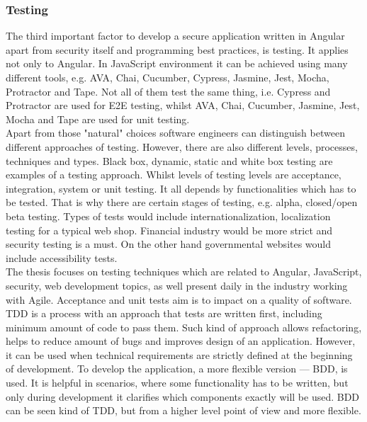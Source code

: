 \documentclass{article} %
\begin{document}
\subsubsection{Testing}
The third important factor to develop a secure application written in Angular apart from security itself and programming best practices, is testing. It applies not only to Angular. In JavaScript environment it can be achieved using many different tools, e.g. AVA, Chai, Cucumber, Cypress, Jasmine, Jest, Mocha, Protractor and Tape. Not all of them test the same thing, i.e. Cypress and Protractor are used for E2E testing, whilst AVA, Chai, Cucumber, Jasmine, Jest, Mocha and Tape are used for unit testing.\\
\newline
Apart from those "natural" choices software engineers can distinguish between different approaches of testing. However, there are also different levels, processes, techniques and types. Black box, dynamic, static and white box testing are examples of a testing approach. Whilst levels of testing levels are acceptance, integration, system or unit testing. It all depends by functionalities which has to be tested. That is why there are certain stages of testing, e.g. alpha, closed/open beta testing. Types of tests would include internationalization, localization testing for a typical web shop. Financial industry would be more strict and security testing is a must. On the other hand governmental websites would include accessibility tests.\\
\newline
The thesis focuses on testing techniques which are related to Angular, JavaScript, security, web development topics, as well present daily in the industry working with Agile. Acceptance and unit tests aim is to impact on a quality of software. TDD is a process with an approach that tests are written first, including minimum amount of code to pass them. Such kind of approach allows refactoring, helps to reduce amount of bugs and improves design of an application. However, it can be used when technical requirements are strictly defined at the beginning of development. To develop the application, a more flexible version --- BDD, is used. It is helpful in scenarios, where some functionality has to be written, but only during development it clarifies which components exactly will be used. BDD can be seen kind of TDD, but from a higher level point of view and more flexible.\\
\end{document}
